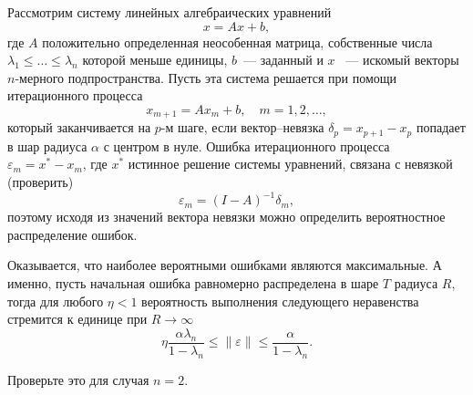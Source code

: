 \begin{problem}
Рассмотрим систему линейных алгебраических уравнений 
\begin{equation*}
x=Ax+b,
\end{equation*}
где $A$ положительно определенная неособенная матрица, собственные числа $\lambda_1\leq\dots\leq\lambda_n$ которой меньше единицы, $b$~--- заданный и  $x$ ~--- искомый векторы $n$-мерного подпространства. Пусть эта система решается при помощи итерационного процесса 
\begin{equation*}
x_{m+1}= Ax_{m}+b,\quad m=1,2,\dots,
\end{equation*}
 который заканчивается на $p$-м шаге, если вектор--невязка $\delta_p = x_{p+1}-x_{p}$ попадает в шар радиуса $\alpha$ с центром в нуле. 
Ошибка итерационного процесса $\varepsilon_m = x^{*} - x_m$, где  $x^{*}$ истинное решение системы уравнений, связана с невязкой  (проверить)
 \begin{equation*}
\varepsilon_m = (I-A)^{-1}\delta_m,
\end{equation*}
поэтому  исходя из значений вектора невязки можно определить вероятностное распределение  ошибок. 

Оказывается, что наиболее вероятными ошибками являются максимальные.
А именно, пусть начальная ошибка равномерно распределена в шаре $T$ радиуса $R$, тогда для любого $\eta<1$ вероятность выполнения следующего неравенства стремится к единице при $R\to\infty$
\begin{equation*}
\eta \frac{\alpha \lambda_n}{1-\lambda_n}\leq \|\varepsilon\| \leq \frac{\alpha}{1-\lambda_n}.
\end{equation*} 

Проверьте это для случая $n=2$.

\end{problem}

